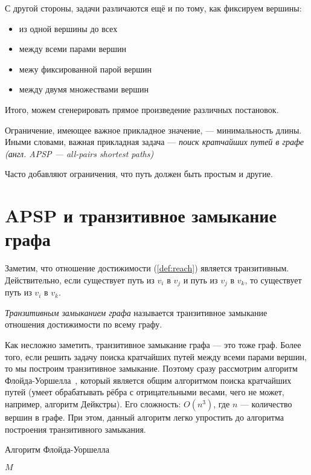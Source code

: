 С другой стороны, задачи различаются ещё и по тому, как фиксируем вершины:
\begin{itemize}
\item из одной вершины до всех
\item между всеми парами вершин
\item межу фиксированной парой вершин
\item между двумя множествами вершин
\end{itemize}

Итого, можем сгенерировать прямое произведение различных постановок.

Ограничение, имеющее важное прикладное значение, --- минимальность длины.
Иными словами, важная прикладная задача --- \textit{поиск кратчайших путей в графе (англ. APSP --- all-pairs shortest paths)}

Часто добавляют ограничения, что путь должен быть простым и другие.

\section{APSP и транзитивное замыкание графа}

Заметим, что отношение достижимости (\ref{def:reach}) является транзитивным.
Действительно, если существует путь из $v_i$ в $v_j$ и путь из $v_j$ в $v_k$, то существует путь из $v_i$ в $v_k$.

\begin{definition}
  \textit{Транзитивным замыканием графа} называется транзитивное замыкание отношения достижимости по всему графу.
\end{definition}

Как несложно заметить, транзитивное замыкание графа --- это тоже граф.
Более того, если решить задачу поиска кратчайших путей между всеми парами вершин, то мы построим транзитивное замыкание.
Поэтому сразу рассмотрим алгоритм Флойда-Уоршелла~\cite{Floyd1962, Bernard1959, Warshall1962}, который является общим алгоритмом поиска кратчайших путей (умеет обрабатывать рёбра с отрицательными весами, чего не может, например, алгоритм Дейкстры). Его сложность: $O(n^3)$, где $n$ --- количество вершин в графе.
При этом, данный алгоритм легко упростить до алгоритма построения транзитивного замыкания.

\begin{algorithm}
\begin{algorithmic}[1]
\caption{Алгоритм Флойда-Уоршелла}
\label{lst:algoFloydWarxhall}
        \EndFor
      \EndFor
    \EndFor
\State \Return $M$
\EndFunction
\end{algorithmic}
\end{algorithm}


